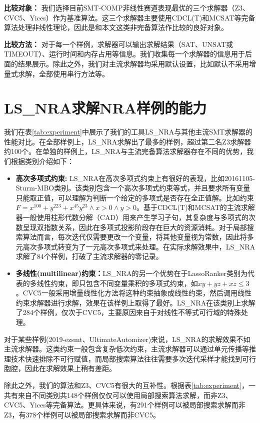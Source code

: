  \textbf{比较对象：} 我们选择目前SMT-COMP非线性赛道表现最优的三个求解器（Z3\cite{MouraB08}、CVC5\cite{BarbosaBBKLMMMN22}、Yices\cite{Dutertre14}）作为基准算法。这三个求解器主要使用CDCL(T)和MCSAT等完备算法处理非线性理论，因此是和本文这类非完备算法作比较的良好对象。

\textbf{比较方法：} 对于每一个样例，求解器可以输出求解结果（SAT、UNSAT或TIMEOUT）、运行时间和内存占用等信息。我们收集每一个求解器的信息用于后面的结果展示。除此之外，我们对主流求解器均采用默认设置，比如默认不采用增量式求解，全部使用串行方法等。

\section{LS\_NRA求解NRA样例的能力}
我们在表\ref{tab:experiment}中展示了我们的工具LS\_NRA与其他主流SMT求解器的性能对比。在全部样例上，LS\_NRA求解出了最多的样例，超过第二名Z3求解器约100个。在单独的样例上，LS\_NRA与主流完备算法求解器存在不同的优势，我们根据类别介绍如下：
\begin{itemize}
    \item \textbf{高次多项式约束:} 
    LS\_NRA在高次多项式约束上有很好的表现，比如20161105-Sturm-MBO类别。该类别包含一个高次多项式约束等式，并且要求所有变量只能取正值，可以理解为判断一个给定的多项式是否存在全正值解。比如约束$F = x^100 + y^ 223 + x^45 y^23 \wedge x > 0 \wedge y > 0$。基于CDCL(T)和MCSAT的主流求解器一般使用柱形代数分解（CAD）用来产生学习子句，其复杂度与多项式的次数呈现双指数关系，因此在多项式投影阶段存在巨大的资源消耗。对于局部搜索算法而言，每次迭代仅需要更改一个变量，将其他变量视为常数，因此将多元高次多项式转变为了一元高次多项式来处理。在实际求解效果中，LS\_NRA求解了84个样例，打破了主流求解器的零记录。

    \item \textbf{多线性(multilinear)约束：}LS\_NRA的另一个优势在于LassoRanker类别为代表的多线性约束，即只包含不同变量乘积的多项式约束，如$x y + y z + x z \leq 3$。CVC5一般采用增量线性化方法将这种约束抽象成线性约束，然后调用线性约束求解器进行求解，效果在该样例上取得了最好。LS\_NRA在该类别上求解了284个样例，仅次于CVC5，主要原因来自于对线性不等式可行域的特殊处理。
\end{itemize}

对于某些样例(2019-ezsmt、UltimateAutomizer)来说，LS\_NRA的求解效果不如主流求解器。这类约束一般包含复杂低次约束，主流求解器可以通过单元传播等推理技术快速排除不可行赋值，而局部搜索算法往往需要多次迭代采样才能找到可行胞腔，因此在求解效果上稍有差距。

除此之外，我们的算法和Z3、CVC5有很大的互补性。根据表\ref{tab:experiment}，一共有来自不同类别共148个样例仅仅可以使用局部搜索算法求解，而非Z3、CVC5、Yices等完备算法。更具体来说，有291个样例可以被局部搜索求解而非Z3，有378个样例可以被局部搜索求解而非CVC5。

